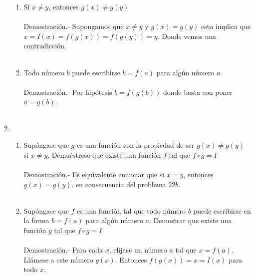 \begin{enumerate}[\bfseries 1.]
	\begin{enumerate}[\bfseries (a)]

	    \item Si $x\neq y$, entonces $g(x)\neq g(y)$\\\\
		Demostración.-\; Supongamos que $x\neq y$ y $g(x)=g(y)$ esto implica que $x=I(x)=f(g(x))=f(g(y))=y$. Donde vemos una contradicción.\\\\

	    \item Todo número $b$ puede escribirse $b=f(a)$ para algún número $a$.\\\\
		Demostración.-\; Por hipótesis $b=f(g(b))$ donde basta con poner $a=g(b)$.\\\\

	\end{enumerate}

	\item 
	
	\begin{enumerate}[\bfseries (a)]

	    \item Supóngase que $g$ es una función con la propiedad de ser $g(x)\neq g(y)$ si $x\neq y$. Demuéstrese que existe una función $f$ tal que $f\circ g = I$\\\\
		Demostración.-\; Es equivalente enunciar que si $x=y$, entonces $g(x)=g(y)$. en consecuencia del problema $22b$.\\\\

	    \item Supóngase que $f$ es una función tal que todo número $b$ puede escribirse en la forma $b=f(a)$ para algún número $a$. Demostrar que existe una función $g$ tal que $f\circ g=I$\\\\
		Demostración.-\; Para cada $x$, elíjase un número $a$ tal que $x=f(a)$. Llámese a este número $g(x)$. Entonces $f(g(x))=x=I(x)$ para todo $x$.\\\\ 

	\end{enumerate}


\end{enumerate}
